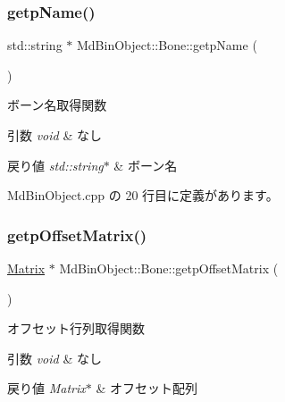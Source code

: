 \subsubsection{\texorpdfstring{getp\+Name()}{getpName()}}
{\footnotesize\ttfamily std\+::string $\ast$ Md\+Bin\+Object\+::\+Bone\+::getp\+Name (\begin{DoxyParamCaption}{ }\end{DoxyParamCaption})}



ボーン名取得関数 


\begin{DoxyParams}{引数}
{\em void} & なし \\
\hline
\end{DoxyParams}

\begin{DoxyRetVals}{戻り値}
{\em std\+::string$\ast$} & ボーン名 \\
\hline
\end{DoxyRetVals}


 Md\+Bin\+Object.\+cpp の 20 行目に定義があります。

\mbox{\label{class_md_bin_object_1_1_bone_ac700babba67e7d39ff6e894ca7831b51}} 
\subsubsection{\texorpdfstring{getp\+Offset\+Matrix()}{getpOffsetMatrix()}}
{\footnotesize\ttfamily \mbox{\hyperlink{class_matrix}{Matrix}} $\ast$ Md\+Bin\+Object\+::\+Bone\+::getp\+Offset\+Matrix (\begin{DoxyParamCaption}{ }\end{DoxyParamCaption})}



オフセット行列取得関数 


\begin{DoxyParams}{引数}
{\em void} & なし \\
\hline
\end{DoxyParams}

\begin{DoxyRetVals}{戻り値}
{\em Matrix$\ast$} & オフセット配列 \\
\hline
\end{DoxyRetVals}


